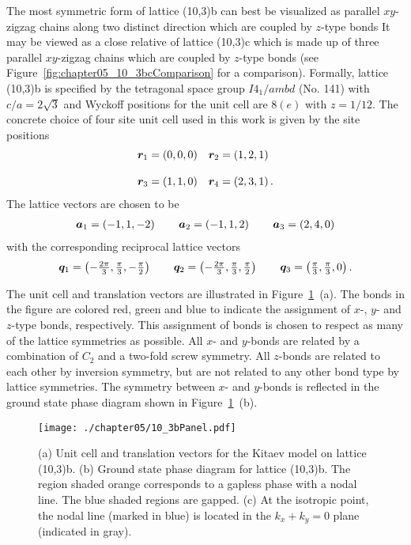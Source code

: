 The most symmetric form of lattice (10,3)b can best be visualized as parallel $xy$-zigzag chains along two distinct direction which are coupled by $z$-type bonds
It may be viewed as a close relative of lattice (10,3)c which is made up of three parallel $xy$-zigzag chains which are coupled by $z$-type bonds (see Figure~\ref{fig:chapter05_10_3bcComparison} for a comparison).
Formally, lattice (10,3)b is specified by the tetragonal space group $I4_{1}/ambd$ (No. 141) with $c/a = 2\sqrt{3}$ and Wyckoff positions for the unit cell are $8(e)$ with $z = 1/12$.
The concrete choice of four site unit cell used in this work is given by the site positions
%
\begin{equation}
	\begin{matrix*}[l]
		\br_1 = \left(0, 0, 0\right) &
		\br_2 = \left(1, 2, 1\right) \\
		&\\
		\br_3 = \left(1, 1, 0\right) &
		\br_4 = \left(2, 3, 1\right).
	\end{matrix*}
\end{equation}
%
The lattice vectors are chosen to be
%
\begin{equation}
	\begin{matrix*}[l]
		\ba_1 = \left(-1, 1, -2\right) \qquad
		\ba_2 = \left(-1, 1, 2\right) \qquad
		\ba_3 = \left(2, 4, 0\right)
	\end{matrix*}
\end{equation}
%
with the corresponding reciprocal lattice vectors
%
\begin{equation}
	\begin{matrix*}[l]
		\bq_1 = \left(-\frac{2\pi}{3}, \frac{\pi}{3}, -\frac{\pi}{2}\right) \qquad
		\bq_2 = \left(-\frac{2\pi}{3}, \frac{\pi}{3}, \frac{\pi}{2}\right) \qquad
		\bq_3 = \left(\frac{\pi}{3}, \frac{\pi}{3}, 0\right).
	\end{matrix*}
\end{equation}
%

The unit cell and translation vectors are illustrated in Figure~\ref{fig:chapter05_10_3bPanel}~(a).
The bonds in the figure are colored red, green and blue to indicate the assignment of $x$-, $y$- and $z$-type bonds, respectively.
This assignment of bonds is chosen to respect as many of the lattice symmetries as possible.
All $x$- and $y$-bonds are related by a combination of $C_2$ and a two-fold screw symmetry.
All $z$-bonds are related to each other by inversion symmetry, but are not related to any other bond type by lattice symmetries.
The symmetry between $x$- and $y$-bonds is reflected in the ground state phase diagram shown in Figure~\ref{fig:chapter05_10_3bPanel}~(b).
%
\begin{figure}[tb]
	\centering
	\texttt{[image: ./chapter05/10\_3bPanel.pdf]}
	\caption{
		(a) Unit cell and translation vectors for the Kitaev model on lattice (10,3)b.
		(b) Ground state phase diagram for lattice (10,3)b.
		The region shaded orange corresponds to a gapless phase with a nodal line.
		The blue shaded regions are gapped.
		(c) At the isotropic point, the nodal line (marked in blue) is located in the $k_x + k_y = 0$ plane (indicated in gray).
	}
	\label{fig:chapter05_10_3bPanel}
\end{figure}
%


